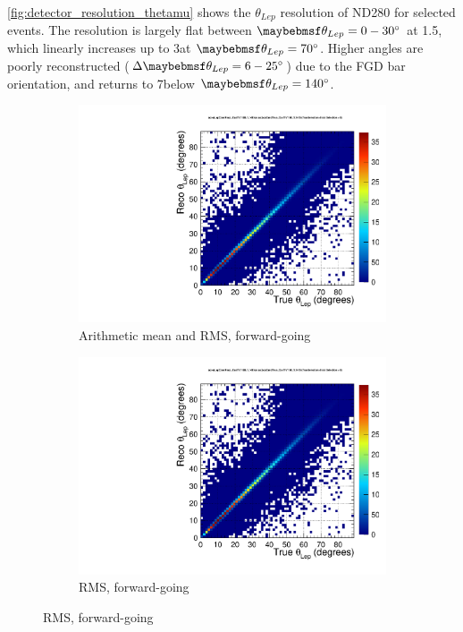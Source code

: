 \autoref{fig:detector_resolution_thetamu} shows the $\theta_{Lep}$ resolution of ND280 for selected events. The resolution is largely flat between $\theta_{Lep}=0-30\text{\degree}$ at 1.5\degree, which linearly increases up to 3\degree at $\theta_{Lep}=70\text{\degree}$. Higher angles are poorly reconstructed ($\Delta \theta_{Lep}=6-25\text{\degree}$) due to the FGD bar orientation, and returns to 7\degree below $\theta_{Lep}=140\text{\degree}$.
\begin{figure}[h]
	\begin{subfigure}[t]{0.49\textwidth}
		\includegraphics[width=\textwidth, trim={0mm 0mm 17mm 0mm}, clip,page=2]{figures/det/resolution/LepCandTrue_And_Reco_Th_Forward_ForJacob}
		\caption{Arithmetic mean and RMS, forward-going}
	\end{subfigure}
	\begin{subfigure}[t]{0.49\textwidth}
		\includegraphics[width=\textwidth, trim={0mm 0mm 17mm 0mm}, clip,page=4]{figures/det/resolution/LepCandTrue_And_Reco_Th_Forward_ForJacob}
		\caption{RMS, forward-going}
	\end{subfigure}


\end{figure}
